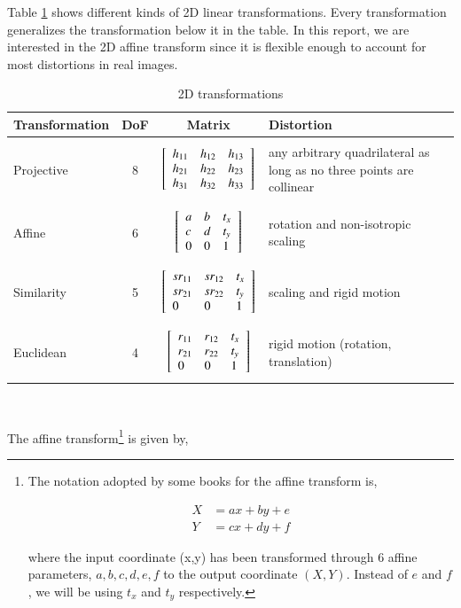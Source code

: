 Table \ref{table:2Dtransformations} shows different kinds of 2D linear transformations.  Every transformation generalizes the transformation below it in the table.  In this report, we are interested in the 2D affine transform since it is flexible enough to account for most distortions in real images.

								\begin{table}[t]
								\centering
								\begin{tabular}{| l | c | c | p{2.5in} |}
								\hline
								Transformation & DoF & Matrix & Distortion\\ \hline 
								& & & \\ Projective & 8 & $\left[ \begin{array}{lll} h_{11} & h_{12} & h_{13} \\ h_{21} & h_{22} & h_{23} \\ h_{31} & h_{32} & h_{33} \\ \end{array} \right]$ & any arbitrary quadrilateral as long as no three points are collinear\\  & & & \\ \hline
								& & & \\ Affine & 6 & $\left[ \begin{array}{lll} a &b & t_x \\ c & d & t_y \\ 0 & 0 & 1 \\ \end{array} \right]$ & rotation and non-isotropic scaling\\  & & & \\ \hline
								& & & \\ Similarity & 5 & $\left[ \begin{array}{lll} sr_{11} & sr_{12} & t_x \\ sr_{21} & sr_{22} & t_y \\ 0 & 0 & 1 \\ \end{array} \right]$ & scaling and rigid motion\\  & & & \\ \hline
								& & & \\ Euclidean & 4 & $\left[ \begin{array}{lll} r_{11} & r_{12} & t_x \\ r_{21} & r_{22} & t_y \\ 0 & 0 & 1 \\ \end{array} \right]$ & rigid motion (rotation, translation) \\  & & & \\ \hline
								\end{tabular}\
								\caption{2D transformations}
								\label{table:2Dtransformations}
								\end{table}

The affine transform\footnote{The notation adopted by some books for the affine transform is,

\begin{equation}
\begin{array}{llllllll}
X &= ax + by + e\\
Y &= cx + dy + f
\end{array}
\label{Eq:AffineDecomposition}
\end{equation}

where the input coordinate (x,y) has been transformed through 6 affine parameters, $a, b, c, d, e, f$ to the output coordinate $(X,Y)$.  Instead of $e$ and $f$, we will be using $t_x$ and $t_y$ respectively.}
 is given by,

